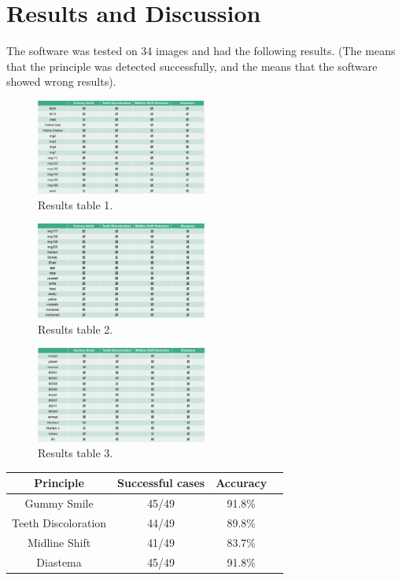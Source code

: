 \documentclass[conference,twocolumn]{IEEEtran}
\begin{document}
\section{Results and Discussion}
The software was tested on 34 images and had the following results. (The \checkmark means that the principle was detected successfully, and the  means that the software showed wrong results).

\begin{figure}[H]
    \centering
    \includegraphics[width=0.5\textwidth]{Screenshot_1.png}
    \caption{Results table 1.}
    \label{fig:my_label}
\end{figure}
\begin{figure}[H]
    \centering
    \includegraphics[width=0.5\textwidth]{Screenshot_2.png}
    \caption{Results table 2.}
    \label{fig:my_label}
\end{figure}
\begin{figure}[H]
    \centering
    \includegraphics[width=0.5\textwidth]{Screenshot_3.png}
    \caption{Results table 3.}
    \label{fig:my_label}
\end{figure}
\begin{center}
\begin{tabular}{||c c c c||} 
 \hline
 Principle & Successful cases & Accuracy \\ [0.5ex] 
 \hline\hline
 Gummy Smile & 45/49 & 91.8\% \\[1ex] 
 \hline
 Teeth Discoloration & 44/49 & 89.8\% \\[1ex] 
 \hline
 Midline Shift & 41/49 & 83.7\% \\[1ex] 
 \hline
 Diastema & 45/49 & 91.8\% \\ [1ex] 
\hline
\end{tabular}
\end{center}
\end{document}
